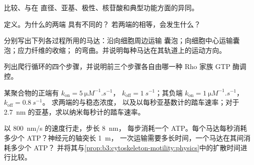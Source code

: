 \begin{exercise}[$\star$]\label{exo:b3:cytoskeleton-motility:1}
比较、与在
直径、亚基、极性、核苷酸和典型功能方面的异同。
\end{exercise}

\begin{exercise}[$\star$]\label{exo:b3:cytoskeleton-motility:2}
定义。为什么的两端
具有不同的？
若两端的相等，会发生什么？
\end{exercise}

\begin{exercise}[$\star$]\label{exo:b3:cytoskeleton-motility:3}
分别写出下列各过程所用的马达：沿向细胞周边运输
囊泡；向细胞中心运输囊泡；应力纤维的收缩；
的弯曲。并说明每种马达在其轨道上的运动方向。
\end{exercise}

\begin{exercise}[$\star$]\label{exo:b3:cytoskeleton-motility:4}
列出爬行循环的四个步骤，并说明前三个步骤各自由哪一种
Rho 家族 GTP 酶调控。
\end{exercise}

\begin{exercise}[$\star\star$]\label{exo:b3:cytoskeleton-motility:5}
某聚合物的正端有 $k_{\mathrm{on}} = \qty{5}{\micro M^{-1}.s^{-1}}$，
$k_{\mathrm{off}} = \qty{1}{s^{-1}}$；其负端 $k_{\mathrm{on}} =
\qty{1}{\micro M^{-1}.s^{-1}}$，$k_{\mathrm{off}} = \qty{0.8}{s^{-1}}$。
求两端的与稳态浓度，
以及以每秒亚基数计的踏车速率；对于
\qty{2.7}{nm} 的亚基，求以纳米每秒计的踏车速率。
\end{exercise}

\begin{exercise}[$\star\star$]\label{exo:b3:cytoskeleton-motility:6}
以 \qty{800}{nm/s} 的速度行走，步长 \qty{8}{nm}，
每步消耗一个 ATP。每个马达每秒消耗多少个 ATP？神经元的轴突长 \qty{1}{m}，
一次运输需要多长时间，一个马达在其间消耗多少个 ATP？
并将其与\cref{prop:b3:cytoskeleton-motility:physics}中的扩散时间进行比较。
\end{exercise}

